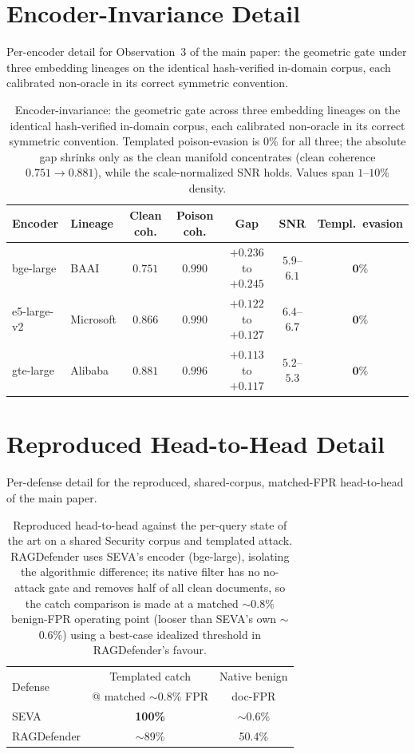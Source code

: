 \documentclass[10pt,journal,compsoc]{IEEEtran}
\begin{document}
\section{Encoder-Invariance Detail}
\label{app:encoder}
Per-encoder detail for Observation~3 of the main paper: the geometric gate under three embedding lineages on the identical hash-verified in-domain corpus, each calibrated non-oracle in its correct symmetric convention.

\begin{table}[t]
\centering
\caption{Encoder-invariance: the geometric gate across three embedding lineages on the
identical hash-verified in-domain corpus, each calibrated non-oracle in its correct
symmetric convention. Templated poison-evasion is $0\%$ for all three; the absolute gap
shrinks only as the clean manifold concentrates (clean coherence $0.751\!\to\!0.881$),
while the scale-normalized SNR holds. Values span $1$--$10\%$ density.}
\label{tab:encoder}
\begin{tabular}{llccccc}
\toprule
Encoder & Lineage & Clean coh. & Poison coh. & Gap & SNR & Templ.\ evasion \\
\midrule
bge-large   & BAAI      & $0.751$ & $0.990$ & $+0.236$ to $+0.245$ & $5.9$--$6.1$ & $\mathbf{0\%}$ \\
e5-large-v2 & Microsoft & $0.866$ & $0.990$ & $+0.122$ to $+0.127$ & $6.4$--$6.7$ & $\mathbf{0\%}$ \\
gte-large   & Alibaba   & $0.881$ & $0.996$ & $+0.113$ to $+0.117$ & $5.2$--$5.3$ & $\mathbf{0\%}$ \\
\bottomrule
\end{tabular}
\end{table}

\section{Reproduced Head-to-Head Detail}
\label{app:h2h}
Per-defense detail for the reproduced, shared-corpus, matched-FPR head-to-head of the main paper.

\begin{table}[t]
\centering
\caption{Reproduced head-to-head against the per-query state of the art on a
shared Security corpus and templated attack. RAGDefender uses SEVA's encoder
(bge-large), isolating the algorithmic difference; its native filter has no
no-attack gate and removes half of all clean documents, so the catch comparison
is made at a matched $\sim$0.8\% benign-FPR operating point (looser than SEVA's own
$\sim$0.6\%) using a best-case idealized threshold in RAGDefender's favour.}
\label{tab:h2h}
\begin{tabular}{lcc}
\toprule
\multirow{2}{*}{Defense} & Templated catch & Native benign \\
        & @ matched $\sim$0.8\% FPR & doc-FPR \\
\midrule
SEVA & \textbf{100\%} & $\sim$0.6\% \\
RAGDefender & $\sim$89\% & 50.4\% \\
\bottomrule
\end{tabular}
\end{table}
\end{document}
